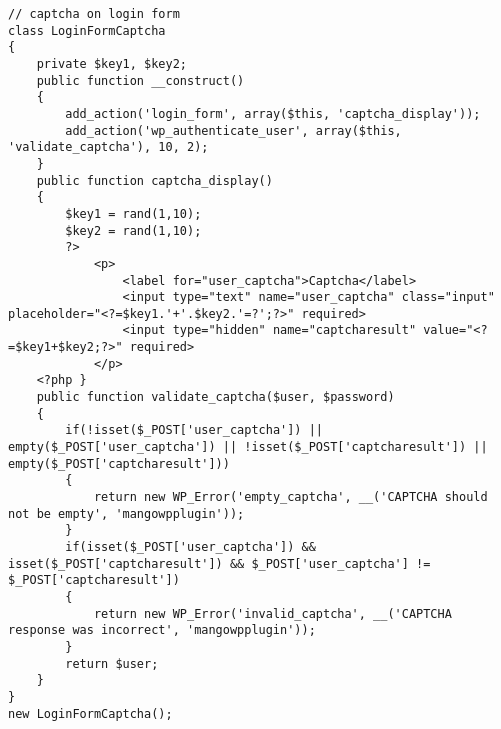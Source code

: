 \begin{lstlisting}
// captcha on login form
class LoginFormCaptcha
{
	private $key1, $key2;
	public function __construct()
	{
		add_action('login_form', array($this, 'captcha_display'));
		add_action('wp_authenticate_user', array($this, 'validate_captcha'), 10, 2);
	}
	public function captcha_display()
	{
		$key1 = rand(1,10);
		$key2 = rand(1,10);
		?>
			<p>
				<label for="user_captcha">Captcha</label>
				<input type="text" name="user_captcha" class="input" placeholder="<?=$key1.'+'.$key2.'=?';?>" required>
				<input type="hidden" name="captcharesult" value="<?=$key1+$key2;?>" required>
			</p>
	<?php }
	public function validate_captcha($user, $password)
	{
		if(!isset($_POST['user_captcha']) || empty($_POST['user_captcha']) || !isset($_POST['captcharesult']) || empty($_POST['captcharesult']))
		{
			return new WP_Error('empty_captcha', __('CAPTCHA should not be empty', 'mangowpplugin'));
		}
		if(isset($_POST['user_captcha']) && isset($_POST['captcharesult']) && $_POST['user_captcha'] != $_POST['captcharesult'])
		{
			return new WP_Error('invalid_captcha', __('CAPTCHA response was incorrect', 'mangowpplugin'));
		}
		return $user;
	}
}
new LoginFormCaptcha();
\end{lstlisting}